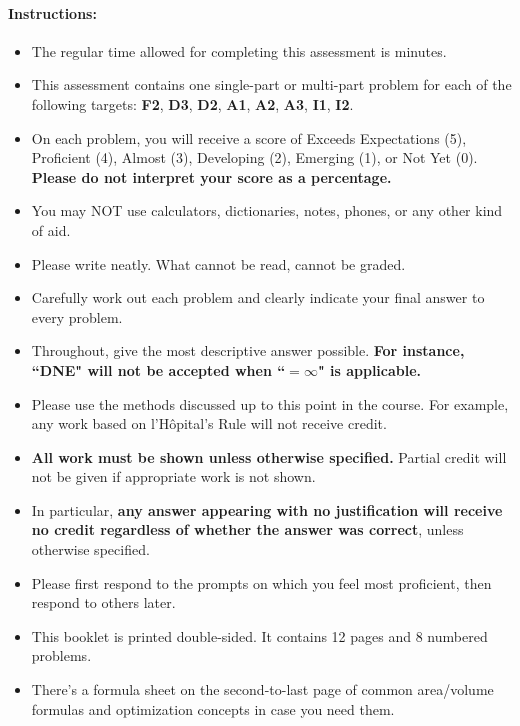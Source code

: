 \documentclass[11pt]{article}
\begin{document}
{%

\paragraph*{Instructions:}

\begin{itemize}
    
    \item The regular time allowed for completing this assessment is  minutes.
    \item This assessment contains one single-part or multi-part problem for each of the following targets:  {\bf\color{ProcessBlue}F2}, {\bf\color{ForestGreen}D3}, {\bf\color{ForestGreen}D2}, {\bf\color{RedOrange}A1}, {\bf\color{RedOrange}A2}, {\bf\color{RedOrange}A3}, {\bf\color{Fuchsia}I1}, {\bf\color{Fuchsia}I2}.
    \item On each problem, you will receive a score of Exceeds Expectations (5), Proficient (4), Almost (3), Developing (2), Emerging (1), or Not Yet (0). {\bf Please do not interpret your score as a percentage.}
    \item You may NOT use calculators, dictionaries, notes, phones, or any other kind of aid.
    \item Please write neatly. What cannot be read, cannot be graded.
    \item Carefully work out each problem and clearly indicate your final answer to every problem.
    \item Throughout, give the most descriptive answer possible. \textbf{For instance, ``DNE" will not be accepted when ``$=\infty$" is applicable.}
    \item Please use the methods discussed up to this point in the course. For example, any work based on l'H\^opital's Rule will not receive credit.
    \item \textbf{All work must be shown unless otherwise specified.} Partial credit will not be given if appropriate work is not shown.
    \item In particular, {\bf any answer appearing with no justification will receive no credit regardless of whether the answer was correct}, unless otherwise specified.
    \item Please first respond to the prompts on which you feel most proficient, then respond to others later.
    \item This booklet is printed double-sided. It contains 12 pages and 8 numbered problems.
    \item There's a formula sheet on the second-to-last page of common area/volume formulas and optimization concepts in case you need them.
    \end{itemize}
    
}
\end{document}
